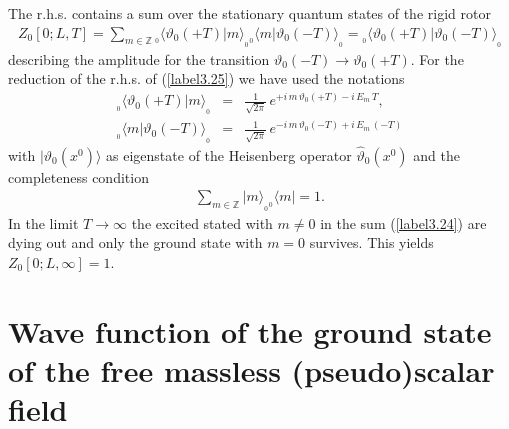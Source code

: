 \documentclass[a4paper,12pt] {article}
\begin{document}
%
The r.h.s. contains a sum over the stationary quantum
states of the rigid rotor \cite{SH81}
%
\begin{eqnarray}\label{label3.25}
Z_0[0;L,T] = \sum_{m \in \mathbb{Z}}{_{_0}\langle \vartheta_0(+T)|m
\rangle_{_0}}{_{_0}\langle m|\vartheta_0(-T)\rangle_{_0}} =
{_{_0}\langle \vartheta_0(+T)|\vartheta_0(-T)\rangle_{_0}}
\end{eqnarray}
%
describing the amplitude for the transition $\vartheta_0(-T) \to
\vartheta_0(+T)$.  For the reduction of the r.h.s. of
(\ref{label3.25}) we have used the notations
%
\begin{eqnarray}\label{label3.26}
{_{_0}\langle\vartheta_0(+T)|m\rangle_{_0}} &=&
\frac{1}{\sqrt{2\pi}}\,e^{\textstyle + i\,m\,\vartheta_0(+T) -
i\,E_m\,T},\nonumber\\ {_{_0}\langle m|\vartheta_0(-T)\rangle_{_0}}
&=&\frac{1}{\sqrt{2\pi}}\,e^{\textstyle - i\,m\,\vartheta_0(-T) +
i\,E_m\,(-T)}
\end{eqnarray}
%
with $|\vartheta_0(x^0)\rangle$ as eigenstate of the Heisenberg
operator $\hat{\vartheta}_0(x^0)$ and the completeness condition
%
\begin{eqnarray}\label{label3.27}
\sum_{m \in \mathbb{Z}}{|m\rangle_{_0}} {_{_0}\langle m|} = 1.
\end{eqnarray}
%
In the limit $T \to \infty$ the excited stated with $m \neq 0$ in the
sum (\ref{label3.24}) are dying out and only the ground state with
$m=0$ survives. This yields $Z_0[0;L,\infty] = 1$.

\section{Wave function of the ground state of the free massless (pseudo)scalar field}
\setcounter{equation}{0}
\end{document}
